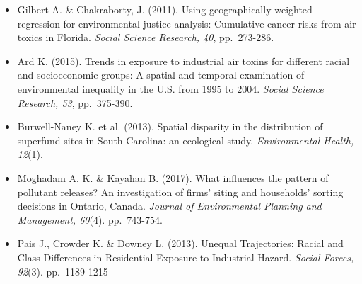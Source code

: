 \documentclass[12pt,twoside]{dukestatscithesis}
\theoremstyle{definition}
\theoremstyle{definition}
\theoremstyle{definition}
\theoremstyle{remark}
\begin{document}
\begin{itemize}
\begin{itemize}
    (AQS).
  \item
    Find that ``Blacks and Latinos are, on average, more likely to be
    exposed to higher levels of NO2, PM2.5, and PM10 than Whites.''
  \item
    More specifically, examines the ``correspondence between
    neighborhood racial composition and pollution levels'' using the
    household level data in PSID.
  \item
    Additionally uses measures of population density and residential
    segregation (measured using multigroup entropy index) of the areas
    each of the households are located in.
  \item
    Uses a multilevel repeated measures model. Level 1 is individual
    intercepts and slopes, Level 2 is the average of all intercepts and
    slopes, with coefficients for race and time, Level 3 accounts for
    metropolitan areas.
  \item
    Conclusions: There are substantial racial differneces in exposure to
    several kinds pollution. This persists even for households in
    similar circumstances. Declines in pollution over time have gone
    predominantly to minority groups.
  \item
    Future work: Disentangle if differences come from ``racially
    distinct patterns of individual mobility'', ``neighborhood change'',
    or industrial siting.
  \end{itemize}
\item
  Gilbert A. \& Chakraborty, J. (2011). Using geographically weighted
  regression for environmental justice analysis: Cumulative cancer risks
  from air toxics in Florida. \emph{Social Science Research, 40},
  pp.~273-286.
\item
  Ard K. (2015). Trends in exposure to industrial air toxins for
  different racial and socioeconomic groups: A spatial and temporal
  examination of environmental inequality in the U.S. from 1995 to 2004.
  \emph{Social Science Research, 53}, pp.~375-390.
\item
  Burwell-Naney K. et al. (2013). Spatial disparity in the distribution
  of superfund sites in South Carolina: an ecological study.
  \emph{Environmental Health, 12}(1).
\item
  Moghadam A. K. \& Kayahan B. (2017). What influences the pattern of
  pollutant releases? An investigation of firms' siting and households'
  sorting decisions in Ontario, Canada. \emph{Journal of Environmental
  Planning and Management, 60}(4). pp.~743-754.
\item
  Pais J., Crowder K. \& Downey L. (2013). Unequal Trajectories: Racial
  and Class Differences in Residential Exposure to Industrial Hazard.
  \emph{Social Forces, 92}(3). pp.~1189-1215
\end{itemize}
\end{document}
